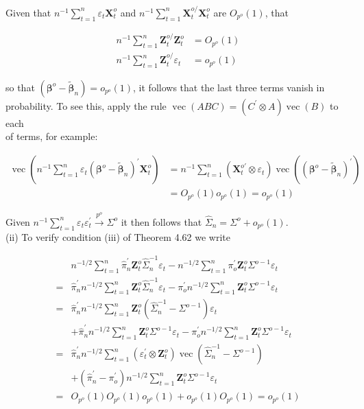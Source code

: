 \documentclass[10pt]{article}
\begin{document}
Given that $n^{-1} \sum_{t=1}^{n} \varepsilon_{t} \mathbf{X}_{t}^{o}$ and $n^{-1} \sum_{t=1}^{n} \mathbf{X}_{t}^{o /} \mathbf{X}_{t}^{o}$ are $O_{p^{o}}(1)$, that

$$
\begin{aligned}
n^{-1} \sum_{t=1}^{n} \mathbf{Z}_{t}^{o /} \mathbf{Z}_{t}^{o} & =O_{p^{o}}(1) \\
n^{-1} \sum_{t=1}^{n} \mathbf{Z}_{t}^{o /} \varepsilon_{t} & =o_{p^{o}}(1)
\end{aligned}
$$

so that $\left(\boldsymbol{\beta}^{o}-\tilde{\boldsymbol{\beta}}_{n}\right)=o_{p^{o}}(1)$, it follows that the last three terms vanish in probability. To see this, apply the rule $\operatorname{vec}(A B C)=\left(C^{\prime} \otimes A\right) \operatorname{vec}(B)$ to each\\
of terms, for example:

$$
\begin{aligned}
\operatorname{vec}\left(n^{-1} \sum_{t=1}^{n} \varepsilon_{t}\left(\boldsymbol{\beta}^{o}-\tilde{\boldsymbol{\beta}}_{n}\right)^{\prime} \mathbf{X}_{t}^{o}\right) & =n^{-1} \sum_{t=1}^{n}\left(\mathbf{X}_{t}^{o \prime} \otimes \varepsilon_{t}\right) \operatorname{vec}\left(\left(\boldsymbol{\beta}^{o}-\tilde{\boldsymbol{\beta}}_{n}\right)^{\prime}\right) \\
& =O_{p^{o}}(1) o_{p^{o}}(1)=o_{p^{o}}(1)
\end{aligned}
$$

Given $n^{-1} \sum_{t=1}^{n} \varepsilon_{t} \varepsilon_{t}^{\prime} \xrightarrow{p^{o}} \Sigma^{o}$ it then follows that $\hat{\Sigma}_{n}=\Sigma^{o}+o_{p^{o}}(1)$.\\
(ii) To verify condition (iii) of Theorem 4.62 we write

$$
\begin{aligned}
& n^{-1 / 2} \sum_{t=1}^{n} \hat{\pi}_{n}^{\prime} \mathbf{Z}_{t}^{o} \hat{\Sigma}_{n}^{-1} \varepsilon_{t}-n^{-1 / 2} \sum_{t=1}^{n} \pi_{o}^{\prime} \mathbf{Z}_{t}^{o} \Sigma^{o-1} \varepsilon_{t} \\
= & \hat{\pi}_{n}^{\prime} n^{-1 / 2} \sum_{t=1}^{n} \mathbf{Z}_{t}^{o} \hat{\Sigma}_{n}^{-1} \varepsilon_{t}-\pi_{o}^{\prime} n^{-1 / 2} \sum_{t=1}^{n} \mathbf{Z}_{t}^{o} \Sigma^{o-1} \varepsilon_{t} \\
= & \hat{\pi}_{n}^{\prime} n^{-1 / 2} \sum_{t=1}^{n} \mathbf{Z}_{t}^{o}\left(\hat{\Sigma}_{n}^{-1}-\Sigma^{o-1}\right) \varepsilon_{t} \\
& +\hat{\pi}_{n}^{\prime} n^{-1 / 2} \sum_{t=1}^{n} \mathbf{Z}_{t}^{o} \Sigma^{o-1} \varepsilon_{t}-\pi_{o}^{\prime} n^{-1 / 2} \sum_{t=1}^{n} \mathbf{Z}_{t}^{o} \Sigma^{o-1} \varepsilon_{t} \\
= & \hat{\pi}_{n}^{\prime} n^{-1 / 2} \sum_{t=1}^{n}\left(\varepsilon_{t}^{\prime} \otimes \mathbf{Z}_{t}^{o}\right) \operatorname{vec}\left(\hat{\Sigma}_{n}^{-1}-\Sigma^{o-1}\right) \\
& +\left(\hat{\pi}_{n}^{\prime}-\pi_{o}^{\prime}\right) n^{-1 / 2} \sum_{t=1}^{n} \mathbf{Z}_{t}^{o} \Sigma^{o-1} \varepsilon_{t} \\
= & O_{p^{o}}(1) O_{p^{o}}(1) o_{p^{o}}(1)+o_{p^{o}}(1) O_{p^{o}}(1)=o_{p^{o}}(1)
\end{aligned}
$$
\end{document}
